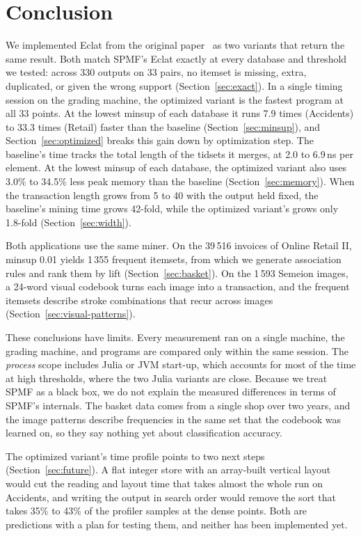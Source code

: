 \section{Conclusion}
We implemented Eclat from the original paper~\cite{zaki2000} as two variants that return
the same result. Both match SPMF's Eclat exactly at every database and threshold we
tested: across 330 outputs on 33 pairs, no itemset is missing, extra, duplicated, or
given the wrong support (Section~\ref{sec:exact}). In a single timing session on the
grading machine, the optimized variant is the fastest program at all 33 points. At the
lowest minsup of each database it runs 7.9 times (Accidents) to 33.3 times (Retail)
faster than the baseline (Section~\ref{sec:minsup}), and Section~\ref{sec:optimized}
breaks this gain down by optimization step. The baseline's time tracks the total length of
the tidsets it merges, at 2.0 to 6.9\,ns per element. At the lowest minsup of each
database, the optimized variant also uses 3.0\% to 34.5\% less peak memory than the
baseline (Section~\ref{sec:memory}). When the transaction length grows from 5 to 40 with
the output held fixed, the baseline's mining time grows 42-fold, while the optimized
variant's grows only 1.8-fold (Section~\ref{sec:width}).

Both applications use the same miner. On the 39\,516 invoices of Online Retail II, minsup
0.01 yields 1\,355 frequent itemsets, from which we generate association rules and rank
them by lift (Section~\ref{sec:basket}). On the 1\,593 Semeion images, a 24-word visual
codebook turns each image into a transaction, and the frequent itemsets describe stroke
combinations that recur across images (Section~\ref{sec:visual-patterns}).

These conclusions have limits. Every measurement ran on a single machine, the grading
machine, and programs are compared only within the same session. The \emph{process}
scope includes Julia or JVM start-up, which accounts for most of the time at high
thresholds, where the two Julia variants are close. Because we treat SPMF as a black box,
we do not explain the measured differences in terms of SPMF's internals. The basket data
comes from a single shop over two years, and the image patterns describe frequencies in
the same set that the codebook was learned on, so they say nothing yet about
classification accuracy.

The optimized variant's time profile points to two next steps (Section~\ref{sec:future}).
A flat integer store with an array-built vertical layout would cut the reading and layout
time that takes almost the whole run on Accidents, and writing the output in search order
would remove the sort that takes 35\% to 43\% of the profiler samples at the dense points.
Both are predictions with a plan for testing them, and neither has been implemented yet.
